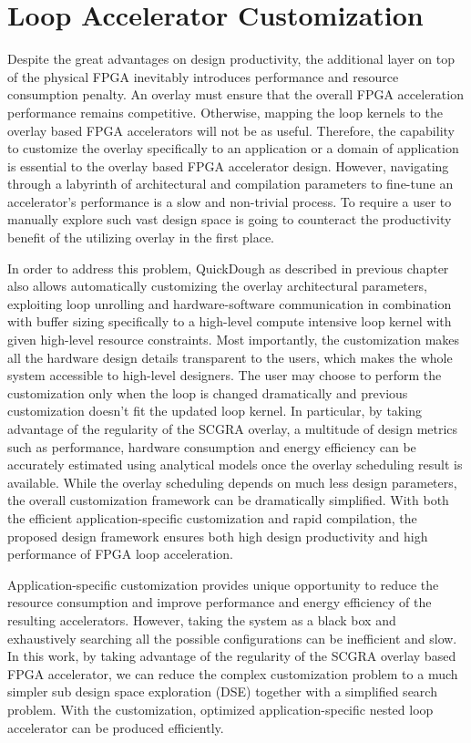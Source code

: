 \chapter{Loop Accelerator Customization} \label{chapter:customization}
Despite the great advantages on design productivity, the additional layer on top of the physical FPGA inevitably introduces performance and resource consumption penalty. An overlay must ensure that the overall FPGA acceleration performance remains competitive. Otherwise, mapping the loop kernels to the overlay based FPGA accelerators will not be as useful. Therefore, the capability to customize the overlay specifically to an application or a domain of application is essential to the overlay based FPGA accelerator design. However, navigating through a labyrinth of architectural and compilation parameters to fine-tune an accelerator's performance is a slow and non-trivial process. To require a user to manually explore such vast design space is going to counteract the productivity benefit of the utilizing overlay in the first place.

In order to address this problem, QuickDough as described in previous chapter also allows automatically customizing the overlay architectural parameters, exploiting loop unrolling and hardware-software communication in combination with buffer sizing specifically to a high-level compute intensive loop kernel with given high-level resource constraints. Most importantly, the customization makes all the hardware design details transparent to the users, which makes the whole system accessible to high-level designers. The user may choose to perform the customization only when the loop is changed dramatically and previous customization doesn't fit the updated loop kernel. In particular, by taking advantage of the regularity of the SCGRA overlay, a multitude of design metrics such as performance, hardware consumption and energy efficiency can be accurately estimated using analytical models once the overlay scheduling result is available. While the overlay scheduling depends on much less design parameters, the overall customization framework can be dramatically simplified. With both the efficient application-specific customization and rapid compilation, the proposed design framework ensures both high design productivity and high performance of FPGA loop acceleration.

Application-specific customization provides unique opportunity to reduce the resource consumption and improve performance and energy efficiency of the resulting accelerators. However, taking the system as a black box and exhaustively searching all the possible configurations can be inefficient and slow. In this work, by taking advantage of the regularity of the SCGRA overlay based FPGA accelerator, we can reduce the complex customization problem to a much simpler sub design space exploration (DSE) together with a simplified search problem. With the customization, optimized application-specific nested loop accelerator can be produced efficiently.

